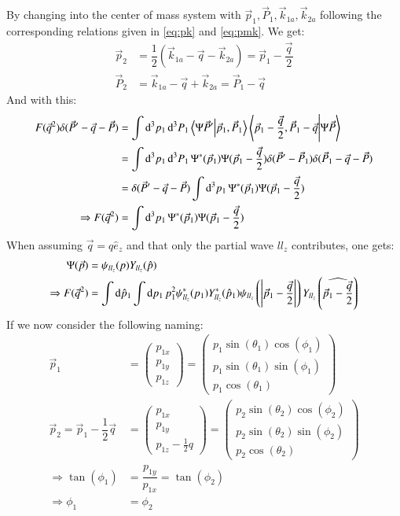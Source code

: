 \documentclass{scrartcl}
\begin{document}
By changing into the center of mass system with $\vec{p}_1,\vec{P}_1,\vec{k}_{1a},\vec{k}_{2a}$ following the corresponding relations given in \ref{eq:pk} and \ref{eq:pmk}. We get:
\begin{align}
	\vec{p}_2&=\dfrac{1}{2}(\vec{k}_{1a}-\vec{q}-\vec{k}_{2a})=\vec{p}_1-\dfrac{\vec{q}}{2}\\
	\vec{P}_2&=\vec{k}_{1a}-\vec{q}+\vec{k}_{2a}=\vec{P}_1-\vec{q}
\end{align}
And with this:
\begin{align}
	F(\vec{q}^2)\delta(\vec{P}'-\vec{q}-\vec{P})&=\int\dd[3]{p_1}\dd[3]{P_1}\bra{\Psi \vec{P}'}\ket{\vec{p}_1,\vec{P}_1}\bra{\vec{p}_1-\dfrac{\vec{q}}{2},\vec{P}_1-\vec{q}}\ket{\Psi\vec{P}}\\
	&=\int\dd[3]{p_1}\dd[3]{P_1}\Psi^*(\vec{p}_1)\Psi(\vec{p}_1-\dfrac{\vec{q}}{2})\delta(\vec{P}'-\vec{P}_1)\delta(\vec{P}_1-\vec{q}-\vec{P})\\
	&=\delta(\vec{P}'-\vec{q}-\vec{P})\int\dd[3]{p_1}\Psi^*(\vec{p}_1)\Psi(\vec{p}_1-\dfrac{\vec{q}}{2})\\
	\Rightarrow F(\vec{q}^2)&=\int\dd[3]{p_1}\Psi^*(\vec{p}_1)\Psi(\vec{p}_1-\dfrac{\vec{q}}{2})\label{eq:F1}
\end{align}
When assuming $\vec{q}=q \hat{e}_z$ and that only the partial wave $ll_z$ contributes, one gets:
\begin{align}
	\Psi(\vec{p})&=\psi_{ll_z}(p) Y_{ll_z}(\hat{p})\\
	\Rightarrow F(\vec{q}^2)&= \int \dd{\hat{p}_1}\int\dd{p_1} p_1^2\psi_{ll_z}^*(p_1) Y_{ll_z}^*(\hat{p}_1)\psi_{ll_z}\left(\abs{\vec{p}_1-\frac{\vec{q}}{2}}\right) Y_{ll_z}\left(\widehat{\vec{p}_1-\frac{\vec{q}}{2}}\right)\label{eq:F2}
\end{align}
If we now consider the following naming:
\begin{align}
	\vec{p}_1&=\left(\begin{array}{c}
	p_{1x}\\
	p_{1y}\\
	p_{1z}
	\end{array}\right)=\left(\begin{array}{c}
	p_{1}\sin(\theta_1)\cos(\phi_1)\\
	p_{1}\sin(\theta_1)\sin(\phi_1)\\
	p_{1}\cos(\theta_1)
	\end{array}\right)\\
	\vec{p}_2=\vec{p}_1-\dfrac{1}{2}\vec{q}&=\left(\begin{array}{c}
	p_{1x}\\
	p_{1y}\\
	p_{1z}-\frac{1}{2}q
	\end{array}\right)=\left(\begin{array}{c}
	p_{2}\sin(\theta_2)\cos(\phi_2)\\
	p_{2}\sin(\theta_2)\sin(\phi_2)\\
	p_{2}\cos(\theta_2)
	\end{array}\right)\\
	\Rightarrow \tan(\phi_1)&=\dfrac{p_{1y}}{p_{1x}}=\tan(\phi_2)\\
	\Rightarrow \phi_1&=\phi_2\label{eq:phi1phi2}
\end{align}
\end{document}
